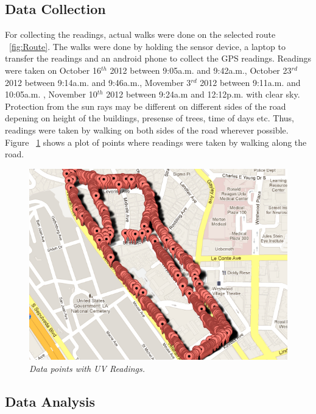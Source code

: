 \documentclass[10pt]{sigplan-proc-varsize}
\begin{document}
\subsection{Data Collection}
For collecting the readings, actual walks were done on the selected route ~\ref{fig:Route}. The walks were done by holding the sensor device, a laptop to transfer the readings and an android phone to collect the GPS readings. Readings were taken on October 16$^{th}$ 2012 between 9:05a.m. and 9:42a.m., October 23$^{rd}$ 2012 between 9:14a.m. and 9:46a.m., Movember 3$^{rd}$ 2012 between 9:11a.m. and 10:05a.m. , November 10$^{th}$ 2012 between 9:24a.m and 12:12p.m. with clear sky. Protection from the sun rays may be different on different sides of the road depening on height of the buildings, presense of trees, time of days etc. Thus, readings were taken by walking on both sides of the road wherever possible. Figure ~\ref{fig:dataPoints} shows a plot of points where readings were taken by walking along the road.
\begin{figure}
\begin{center}
\includegraphics[scale=0.35]{dataPoints.png}
\caption{\small \sl Data points with UV Readings.\label{fig:dataPoints}}
\end{center}
\end{figure}

\subsection{Data Analysis}
\end{document}
